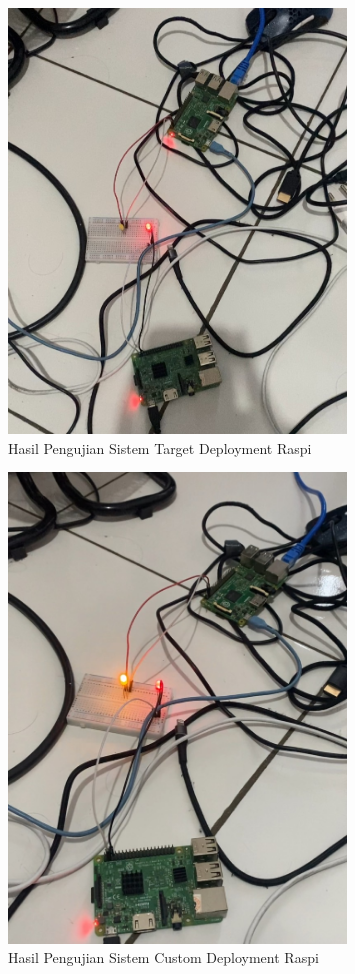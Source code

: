 \begin{figure}[ht]
  \centering
  \includegraphics[width=0.8\textwidth]{resources/chapter-4/pengujian/pengujian-sistem-raspi-hasil-a.jpg}
  \caption{Hasil Pengujian Sistem Target Deployment Raspi}
  \label{fig:hasil-pengujian-sistem-raspi-target}
\end{figure}

\begin{figure}[ht]
  \centering
  \includegraphics[width=0.8\textwidth]{resources/chapter-4/pengujian/pengujian-sistem-raspi-hasil-b.jpg}
  \caption{Hasil Pengujian Sistem Custom Deployment Raspi}
  \label{fig:hasil-pengujian-sistem-raspi-custom}
\end{figure}